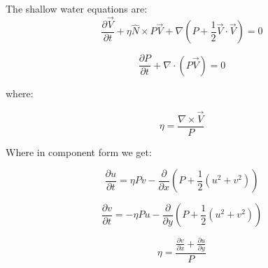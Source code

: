 \documentclass{article}
\begin{document}
The shallow water equations are:
$$ \frac{\partial{\vec{V}}}{\partial t} + \eta \hat{N} \times P \vec{V} + \nabla \left( P + \frac{1}{2}\vec{V} \cdot \vec{V} \right) = 0$$

$$ \frac{\partial{P}}{\partial t} + \nabla \cdot \left( P \vec{V} \right) = 0$$

where:

$$ \eta = \frac{\nabla \times \vec{V}}{P} $$

Where in component form we get:

$$ \frac{\partial u}{\partial t} = \eta P v - \frac{\partial}{\partial x} \left( P + \frac{1}{2} (u^2 + v^2) \right)$$

$$ \frac{\partial v}{\partial t} = -\eta P u - \frac{\partial}{\partial y} \left( P + \frac{1}{2} (u^2 + v^2) \right)$$

$$ \eta = \frac{ \frac{\partial v}{\partial x} + \frac{\partial u}{\partial y} }{P} $$
\end{document}
